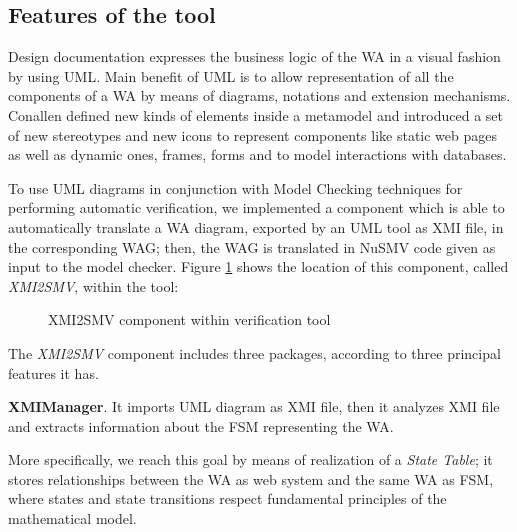 \subsection{Features of the tool}
Design documentation expresses the business logic of the WA in a visual fashion by using UML. Main benefit of UML is to allow representation of all the components of a WA by means of diagrams, notations and extension mechanisms. Conallen \cite{cona-02} defined new kinds of elements inside a metamodel and introduced a set of new stereotypes and new icons to represent components like static web pages as well as dynamic ones, frames, forms and to model interactions with databases.

To use UML diagrams in conjunction with Model Checking techniques for performing automatic verification, we implemented a component which is able to automatically translate a WA diagram, exported by an UML tool as XMI file, in the corresponding WAG; then, the WAG is translated in NuSMV code given as input to the model checker. Figure \ref{fig6} shows the location of this component, called \textit{XMI2SMV}, within the tool: 

\begin{figure}[ht]
\centerline{}
\caption{XMI2SMV component within verification tool \label{fig6}}
\end{figure}

The \textit{XMI2SMV} component includes three packages, according to three principal features it has.

\textbf{XMIManager}. It imports UML diagram as XMI file, then it analyzes XMI file and extracts information about the FSM representing the WA.

More specifically, we reach this goal by means of realization of a \textit{State Table}; it stores relationships between the WA as web system and the same WA as FSM, where states and state transitions respect fundamental principles of the mathematical model.  

